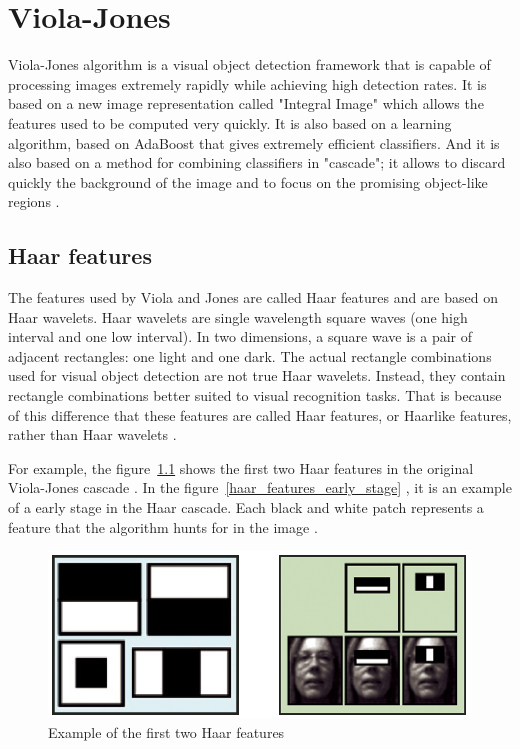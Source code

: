 \chapter{Viola-Jones}

\noindent Viola-Jones algorithm is a visual object detection framework that is capable of processing images extremely rapidly while achieving high detection rates. It is based on a new image representation called "Integral Image" which allows the features used to be computed very quickly. It is also based on a learning algorithm, based on AdaBoost that gives extremely efficient classifiers. And it is also based on a method for combining classifiers in "cascade"; it allows to discard quickly the background of the image and to focus on the promising object-like regions \cite{VIO01}.
\newline

\section{Haar features}

\noindent The features used by Viola and Jones are called Haar features and are based on Haar wavelets. Haar wavelets are single wavelength square waves (one high interval and one low interval). In two dimensions, a square wave is a pair of adjacent rectangles: one light and one dark. The actual rectangle combinations used for visual object detection are not true Haar wavelets. Instead, they contain rectangle combinations better suited to visual recognition tasks. That is because of this difference that these features are called Haar features, or Haarlike features, rather than Haar wavelets \cite{HEW07}.
\newline

\noindent For example, the figure~\ref{haar_features_first_2_stage} shows the first two Haar features in the original Viola-Jones cascade \cite{HEW07}. In the figure~\ref{haar_features_early_stage} , it is an example of a early stage in the Haar cascade. Each black and white patch represents a feature that the algorithm hunts for in the image \cite{HAR12}.
\newline

\begin{figure}[!h]
\begin{center}
\noindent \includegraphics[scale=0.9]{figures/haar_features_first_2_stage} 
\newline
\caption{Example of the first two Haar features}
\label{haar_features_first_2_stage}
\end{center} 
\end{figure}

